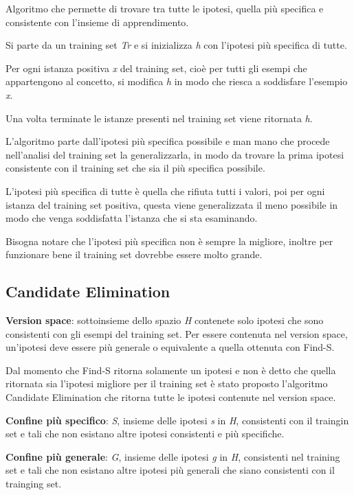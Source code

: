 Algoritmo che permette di trovare tra tutte le ipotesi, quella più
specifica e consistente con l'insieme di apprendimento.

Si parte da un training set \emph{Tr} e si inizializza \emph{h} con
l'ipotesi più specifica di tutte.

Per ogni istanza positiva \emph{x} del training set, cioè per tutti gli
esempi che appartengono al concetto, si modifica \emph{h} in modo che
riesca a soddisfare l'esempio \emph{x}.

Una volta terminate le istanze presenti nel training set viene ritornata
\emph{h}.

L'algoritmo parte dall'ipotesi più specifica possibile e man mano che
procede nell'analisi del training set la generalizzarla, in modo da
trovare la prima ipotesi consistente con il training set che sia il più
specifica possibile.

L'ipotesi più specifica di tutte è quella che rifiuta tutti i valori,
poi per ogni istanza del training set positiva, questa viene
generalizzata il meno possibile in modo che venga soddisfatta l'istanza
che si sta esaminando.

Bisogna notare che l'ipotesi più specifica non è sempre la migliore,
inoltre per funzionare bene il training set dovrebbe essere molto
grande.

\subsection{Candidate Elimination}\label{candidate-elimination}

\textbf{Version space}: sottoinsieme dello spazio \emph{H} contenete
solo ipotesi che sono consistenti con gli esempi del training set. Per
essere contenuta nel version space, un'ipotesi deve essere più generale
o equivalente a quella ottenuta con Find-S.

Dal momento che Find-S ritorna solamente un ipotesi e non è detto che
quella ritornata sia l'ipotesi migliore per il training set è stato
proposto l'algoritmo Candidate Elimination che ritorna tutte le ipotesi
contenute nel version space.

\textbf{Confine più specifico}: \emph{S}, insieme delle ipotesi \emph{s}
in \emph{H}, consistenti con il traingin set e tali che non esistano
altre ipotesi consistenti e più specifiche.

\textbf{Confine più generale}: \emph{G}, insieme delle ipotesi \emph{g}
in \emph{H}, consistenti nel training set e tali che non esistano altre
ipotesi più generali che siano consistenti con il trainging set.

